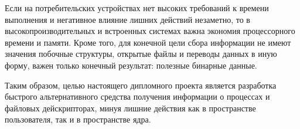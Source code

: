 Если на потребительских устройствах нет высоких требований к времени выполнения
и негативное влияние лишних действий незаметно, то в высокопроизводительных и
встроенных системах важна экономия процессорного времени и памяти. Кроме того,
для конечной цели сбора информации не имеют значения побочные структуры,
открытые файлы и переводы данных в иную форму, важен только конечный результат:
полезные бинарные данные.

Таким образом, целью настоящего дипломного проекта является разработка быстрого
альтернативного средства получения информации о процессах и файловых
дейскрипторах, минуя лишние действия как в пространстве пользователя, так и в
пространстве ядра.
